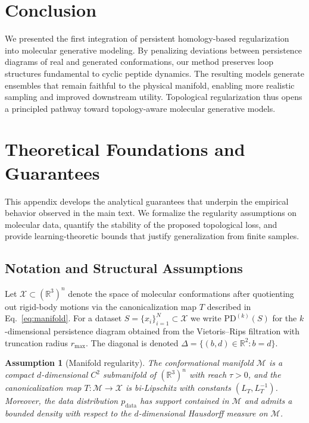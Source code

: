 \documentclass[11pt]{article}
\newtheorem{assumption}{Assumption}
\theoremstyle{definition}
\begin{document}
\section{Conclusion}
We presented the first integration of persistent homology-based regularization into molecular generative modeling. By penalizing deviations between persistence diagrams of real and generated conformations, our method preserves loop structures fundamental to cyclic peptide dynamics. The resulting models generate ensembles that remain faithful to the physical manifold, enabling more realistic sampling and improved downstream utility. Topological regularization thus opens a principled pathway toward topology-aware molecular generative models.

\appendix

\section{Theoretical Foundations and Guarantees}
This appendix develops the analytical guarantees that underpin the empirical behavior observed in the main text. We formalize the regularity assumptions on molecular data, quantify the stability of the proposed topological loss, and provide learning-theoretic bounds that justify generalization from finite samples.

\subsection{Notation and Structural Assumptions}
Let $\mathcal{X} \subset (\mathbb{R}^3)^n$ denote the space of molecular conformations after quotienting out rigid-body motions via the canonicalization map $T$ described in Eq.~\eqref{eq:manifold}. For a dataset $S = \{x_i\}_{i=1}^N \subset \mathcal{X}$ we write $\mathrm{PD}^{(k)}(S)$ for the $k$-dimensional persistence diagram obtained from the Vietoris--Rips filtration with truncation radius $r_{\max}$. The diagonal is denoted $\Delta = \{(b, d) \in \mathbb{R}^2 : b = d\}$.

\begin{assumption}[Manifold regularity]
\label{assumption:manifold}
The conformational manifold $\mathcal{M}$ is a compact $d$-dimensional $C^2$ submanifold of $(\mathbb{R}^3)^n$ with reach $\tau>0$, and the canonicalization map $T : \mathcal{M} \to \mathcal{X}$ is bi-Lipschitz with constants $(L_T, L_T^{-1})$. Moreover, the data distribution $p_{\text{data}}$ has support contained in $\mathcal{M}$ and admits a bounded density with respect to the $d$-dimensional Hausdorff measure on $\mathcal{M}$.
\end{assumption}
\end{document}
